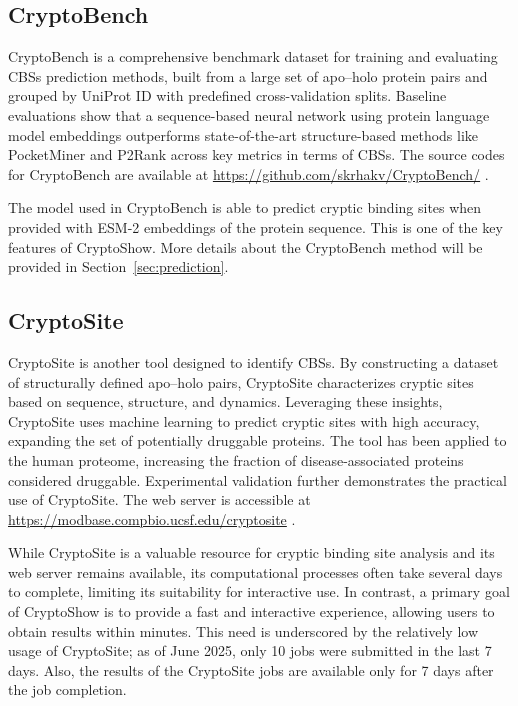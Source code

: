 \subsection{CryptoBench}
\label{sec:cryptobench}

CryptoBench is a comprehensive benchmark dataset for training and evaluating CBSs prediction methods, built from a large set of apo–holo protein pairs and grouped by UniProt ID with predefined cross-validation splits. Baseline evaluations show that a sequence-based neural network using protein language model embeddings outperforms state-of-the-art structure-based methods like PocketMiner \cite{meller2023predicting} and P2Rank \cite{krivak2018p2rank} across key metrics in terms of CBSs. The source codes for CryptoBench are available at \url{https://github.com/skrhakv/CryptoBench/} \cite{vskrhak2025cryptobench}.

The model used in CryptoBench is able to predict cryptic binding sites when provided with ESM-2 embeddings \cite{lin2022language} of the protein sequence. This is one of the key features of CryptoShow. More details about the CryptoBench method will be provided in Section~\ref{sec:prediction}.

\subsection{CryptoSite}
\label{sec:cryptosite}

CryptoSite is another tool designed to identify CBSs. By constructing a dataset of structurally defined apo–holo pairs, CryptoSite characterizes cryptic sites based on sequence, structure, and dynamics. Leveraging these insights, CryptoSite uses machine learning to predict cryptic sites with high accuracy, expanding the set of potentially druggable proteins. The tool has been applied to the human proteome, increasing the fraction of disease-associated proteins considered druggable. Experimental validation further demonstrates the practical use of CryptoSite. The web server is accessible at \url{https://modbase.compbio.ucsf.edu/cryptosite} \cite{cimermancic2016cryptosite}.

While CryptoSite is a valuable resource for cryptic binding site analysis and its web server remains available, its computational processes often take several days to complete, limiting its suitability for interactive use. In contrast, a primary goal of CryptoShow is to provide a fast and interactive experience, allowing users to obtain results within minutes. This need is underscored by the relatively low usage of CryptoSite; as of June 2025, only 10 jobs were submitted in the last 7 days. Also, the results of the CryptoSite jobs are available only for 7 days after the job completion.
